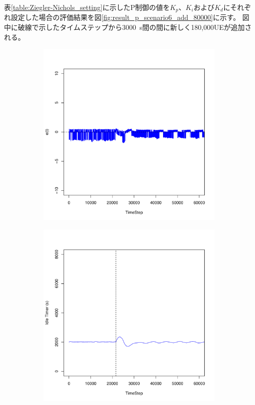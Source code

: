 \documentclass[a4j]{ujarticle}
\begin{document}
\clearpage
表\ref{table:Ziegler-Nichols_setting}に示したP制御の値を$K_p$、$K_i$および$K_d$にそれぞれ設定した場合の評価結果を図\ref{fig:result_p_scenario6_add_80000}に示す。
図中に破線で示したタイムステップから3000~s間の間に新しく180,000UEが追加される。
\begin{figure}[htbp]
 \centering
 \begin{subfigure}{0.49\hsize}
   \centering
   \includegraphics[width=1.0\hsize]{scenario_6_e_345600_691200_1-5_0_0_0_ideal_add_180000.pdf}
   \label{subfig:scenario_6_e_345600_691200_1-5_0_0_0_ideal_add_180000}
 \end{subfigure}
 \begin{subfigure}{0.49\hsize}
   \centering
   \includegraphics[width=1.0\hsize]{scenario_6_idleTimer_345600_691200_1-5_0_0_0_ideal_add_180000.pdf}

\end{subfigure}
\end{figure}
\end{document}
